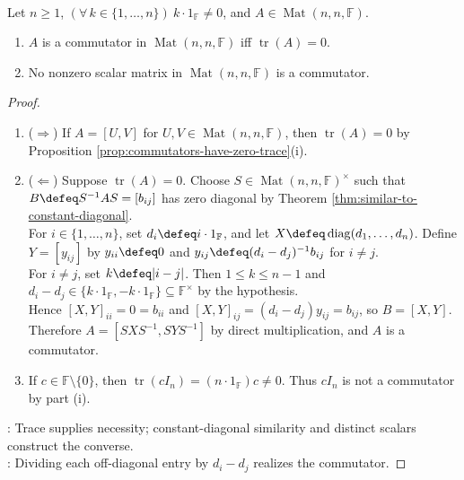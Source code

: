\begin{theorem} \label{thm:shoda-trace-zero-commutators} \\
Let $n\geq1$, $(\forall\,k\in\{1,\ldots,n\})\ k\cdot1_{\mathbb{F}}\neq0$, and $A\in\operatorname{Mat}(n,n,\mathbb{F})$.
\begin{enumerate}[label=(\roman*)]
\setlength{\itemsep}{0pt}
\item $A$ is a commutator in $\operatorname{Mat}(n,n,\mathbb{F})$ iff $\operatorname{tr}(A)=0$.
\item No nonzero scalar matrix in $\operatorname{Mat}(n,n,\mathbb{F})$ is a commutator.
\end{enumerate}
\begin{proof}
\begin{enumerate}[label=(\roman*)]
\setlength{\itemsep}{0pt}
\item[$(i)$] ($\Rightarrow$) If $A=[U,V]$ for $U,V\in\operatorname{Mat}(n,n,\mathbb{F})$, then $\operatorname{tr}(A)=0$ by Proposition \ref{prop:commutators-have-zero-trace}(i).
\item[$(i)$] ($\Leftarrow$) Suppose $\operatorname{tr}(A)=0$. Choose $S\in\operatorname{Mat}(n,n,\mathbb{F})^{\times}$ such that $B\defeq S^{-1}AS=[b_{ij}]$ has zero diagonal by Theorem \ref{thm:similar-to-constant-diagonal}.\\
For $i\in\{1,\ldots,n\}$, set $d_i\defeq i\cdot1_{\mathbb{F}}$, and let $X\defeq\operatorname{diag}(d_1,\ldots,d_n)$. Define $Y=[y_{ij}]$ by $y_{ii}\defeq0$ and $y_{ij}\defeq(d_i-d_j)^{-1}b_{ij}$ for $i\neq j$.\\
For $i\neq j$, set $k\defeq|i-j|$. Then $1\leq k\leq n-1$ and $d_i-d_j\in\{k\cdot1_{\mathbb{F}},-k\cdot1_{\mathbb{F}}\}\subseteq\mathbb{F}^{\times}$ by the hypothesis.\\
Hence $[X,Y]_{ii}=0=b_{ii}$ and $[X,Y]_{ij}=(d_i-d_j)y_{ij}=b_{ij}$, so $B=[X,Y]$.\\
Therefore $A=[SXS^{-1},SYS^{-1}]$ by direct multiplication, and $A$ is a commutator.
\item[$(ii)$] If $c\in\mathbb{F}\setminus\{0\}$, then $\operatorname{tr}(cI_n)=(n\cdot1_{\mathbb{F}})c\neq0$. Thus $cI_n$ is not a commutator by part (i).
\end{enumerate}
: Trace supplies necessity; constant-diagonal similarity and distinct scalars construct the converse.\\
: Dividing each off-diagonal entry by $d_i-d_j$ realizes the commutator.
\end{proof}
\end{theorem}

